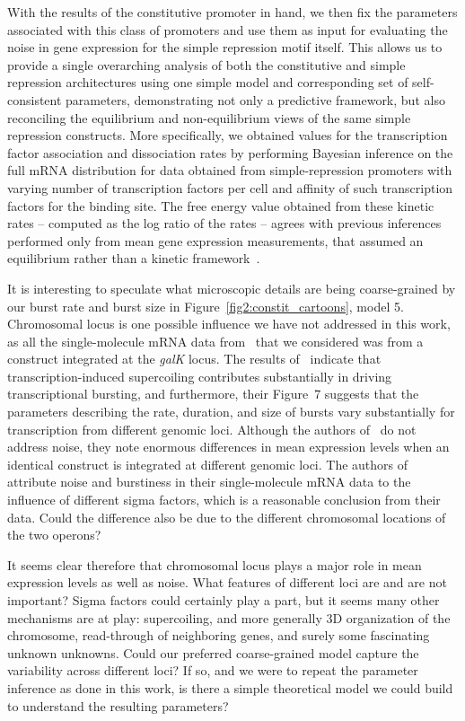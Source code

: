 With the results of the constitutive promoter in hand, we then fix the
parameters associated with this class of promoters and use them as input for
evaluating the noise in gene expression for the simple repression motif itself.
This allows us to provide a single overarching analysis of both the constitutive
and simple repression architectures using one simple model and corresponding set
of self-consistent parameters, demonstrating not only a predictive framework,
but also reconciling the equilibrium and non-equilibrium views of the same
simple repression constructs. More specifically, we obtained values for the
transcription factor association and dissociation rates by performing Bayesian
inference on the full mRNA distribution for data obtained from simple-repression
promoters with varying number of transcription factors per cell and affinity of
such transcription factors for the binding site. The free energy value obtained
from these kinetic rates -- computed as the log ratio of the rates -- agrees
with previous inferences performed only from mean gene expression measurements,
that assumed an equilibrium rather than a kinetic
framework~\cite{Garcia2011a, Razo-Mejia2018}.

It is interesting to speculate what microscopic details are being coarse-grained
by our burst rate and burst size in Figure~\ref{fig2:constit_cartoons}, model 5.
Chromosomal locus is one possible influence we have not addressed in this work,
as all the single-molecule mRNA data from~\cite{Jones2014} that we considered
was from a construct integrated at the \textit{galK} locus. The results
of~\cite{Chong2014} indicate that transcription-induced supercoiling contributes
substantially in driving transcriptional bursting, and furthermore, their
Figure~7 suggests that the parameters describing the rate, duration, and size of
bursts vary substantially for transcription from different genomic loci.
Although the authors of~\cite{Englaender2017} do not address noise, they note
enormous differences in mean expression levels when an identical construct is
integrated at different genomic loci. The authors of~\cite{Engl2020} attribute
noise and burstiness in their single-molecule mRNA data to the influence of
different sigma factors, which is a reasonable conclusion from their data. Could
the difference also be due to the different chromosomal locations of the two
operons?

It seems clear therefore that chromosomal locus plays a major role in mean
expression levels as well as noise. What features of different loci are and are
not important? Sigma factors could certainly play a part, but it seems many
other mechanisms are at play: supercoiling, and more generally 3D organization
of the chromosome, read-through of neighboring genes, and surely some
fascinating unknown unknowns. Could our preferred coarse-grained model capture
the variability across different loci? If so, and we were to repeat the
parameter inference as done in this work, is there a simple theoretical model we
could build to understand the resulting parameters?

